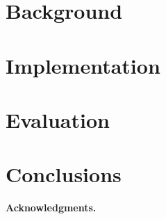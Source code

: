 \documentclass{mpaper}
\begin{document}


    \section{Background}\label{sec:background}




    \section{Implementation}\label{sec:implementation}





    \section{Evaluation}\label{sec:evaluation}




    \section{Conclusions}\label{sec:conclusions}




    \vskip8pt \noindent
    \textbf{Acknowledgments.}

    
    
\end{document}
